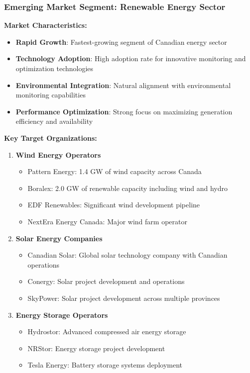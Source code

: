 \subsubsection{Emerging Market Segment: Renewable Energy Sector}

\textbf{Market Characteristics:}
\begin{itemize}
    \item \textbf{Rapid Growth}: Fastest-growing segment of Canadian energy sector
    \item \textbf{Technology Adoption}: High adoption rate for innovative monitoring and optimization technologies
    \item \textbf{Environmental Integration}: Natural alignment with environmental monitoring capabilities
    \item \textbf{Performance Optimization}: Strong focus on maximizing generation efficiency and availability
\end{itemize}

\textbf{Key Target Organizations:}
\begin{enumerate}
    \item \textbf{Wind Energy Operators}
    \begin{itemize}
        \item Pattern Energy: 1.4 GW of wind capacity across Canada
        \item Boralex: 2.0 GW of renewable capacity including wind and hydro
        \item EDF Renewables: Significant wind development pipeline
        \item NextEra Energy Canada: Major wind farm operator
    \end{itemize}
    
    \item \textbf{Solar Energy Companies}
    \begin{itemize}
        \item Canadian Solar: Global solar technology company with Canadian operations
        \item Conergy: Solar project development and operations
        \item SkyPower: Solar project development across multiple provinces
    \end{itemize}
    
    \item \textbf{Energy Storage Operators}
    \begin{itemize}
        \item Hydrostor: Advanced compressed air energy storage
        \item NRStor: Energy storage project development
        \item Tesla Energy: Battery storage systems deployment
    \end{itemize}
\end{enumerate}

